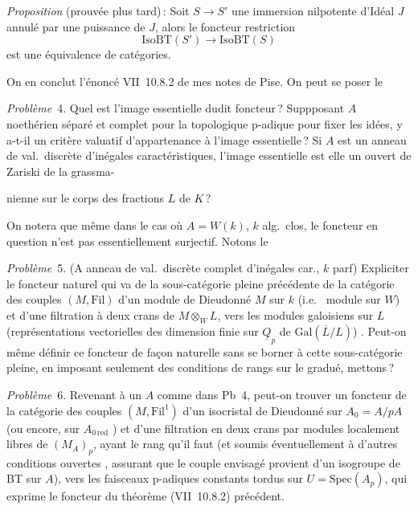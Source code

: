 \documentclass[11pt,a4paper]{article}
\begin{document}
\emph{Proposition} (prouvée plus tard)\,:  Soit $S \to S'$ une immersion nilpotente d'Idéal $J$ annulé par une puissance de $J$, alors le foncteur restriction
\[
  \mathrm{IsoBT}(S') \longrightarrow \mathrm{IsoBT}(S)
\]
est une équivalence de catégories.

On en conclut l'énoncé VII~10.8.2 de mes notes de Pise.  On peut se poser  le

\emph{Problème}~4. Quel est l'image essentielle dudit foncteur\,? Suppposant $A$ noethérien séparé et complet pour la topologique p-adique pour fixer les idées, y a-t-il un critère valuatif d'appartenance à l'image essentielle\,? Si $A$ est un anneau de val.\ discrète d'inégales caractéristiques, l'image essentielle est elle un ouvert de Zariski de la grassma-

nienne sur le corps des fractions  $L$ de $K$\,?

On notera que même dans le cas où $A = W(k)$, $k$ alg.\ clos, le foncteur en question n'est pas  essentiellement surjectif. Notons le

\emph{Problème}~5. (A anneau de val.\ discrète complet d'inégales car., $k$ parf) Expliciter le foncteur naturel qui va de la sous-catégorie pleine précédente de la catégorie des couples $(M, \mathrm{Fil})$ d'un module de Dieudonné $M$ sur  $k$ (i.e.\  module sur $W$) et d'une filtration à deux crans de $M \otimes_W L$, vers les modules galoisiens sur $L$ (représentations vectorielles des dimension finie sur $\underline{Q}_p$ de $\mathrm{Gal}(\overline{L}/L)$) . Peut-on même définir ce foncteur  de façon naturelle sans se borner à cette sous-catégorie pleine, en imposant seulement des conditions de rangs sur le gradué, mettons\,?

\emph{Problème}~6. Revenant à un $A$ comme dans Pb~4, peut-on trouver un foncteur  de la catégorie des couples $(M, \mathrm{Fil}^1)$ d'un isocristal de Dieudonné  sur $A_0 = A/pA$ (ou encore, sur $A_{0\,\mathrm{red}}$ \struck{\ill{}}) et d'une filtration en deux crans par modules localement libres de $(M_A)_p$, ayant le rang qu'il faut (et soumis éventuellement à d'autres conditions ouvertes , assurant que le couple envisagé provient d'un isogroupe de BT sur $A$), vers les faisceaux p-adiques constants tordus sur $U = \mathrm{Spec}(A_p)$, qui exprime le foncteur du théorème (VII~10.8.2) précédent.
\end{document}
